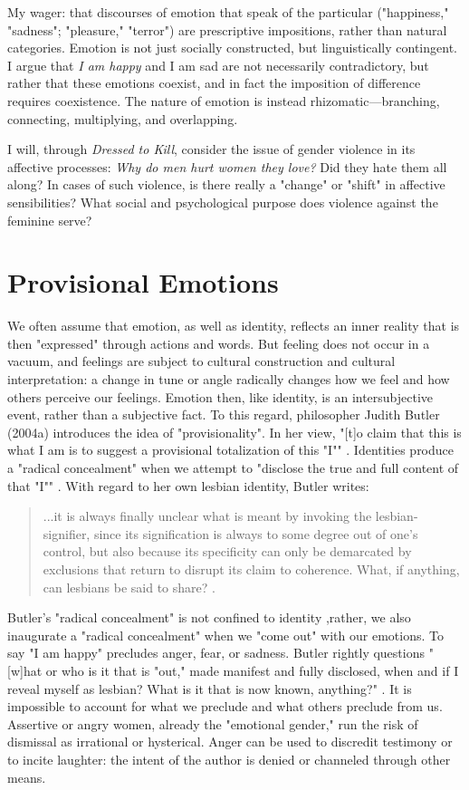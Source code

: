 \documentclass[letterpaper,12pt]{turabian-researchpaper}
\begin{document}
My wager: that discourses of emotion that speak of the particular ("happiness," "sadness"; "pleasure," "terror") are prescriptive impositions, rather than natural categories. Emotion is not just socially constructed, but linguistically contingent. I argue that \textit{I am happy} and {I am sad} are not necessarily contradictory, but rather that these emotions coexist, and in fact the imposition of difference requires coexistence. The nature of emotion is instead rhizomatic---branching, connecting, multiplying, and overlapping. 

I will, through \textit{Dressed to Kill}, consider the issue of gender violence in its affective processes: \textit{Why do men hurt women they love?} Did they hate them all along? In cases of such violence, is there really a "change" or "shift" in affective sensibilities? What social and psychological purpose does violence against the feminine serve?

\section{Provisional Emotions}

We often assume that emotion, as well as identity, reflects an inner reality that is then "expressed" through actions and words. But feeling does not occur in a vacuum, and feelings are subject to cultural construction and cultural interpretation: a change in tune or angle radically changes how we feel and how others perceive our feelings. Emotion then, like identity, is an intersubjective event, rather than a subjective fact. To this regard, philosopher Judith Butler (2004a) introduces the idea of "provisionality". In her view, "[t]o claim that this is what I am is to suggest a provisional totalization of this "I"" \autocite[309]{butler_bodily_2004}. Identities produce a "radical concealment" when we attempt to "disclose the true and full content of that "I"" \autocite[309]{butler_bodily_2004}. With regard to her own lesbian identity, Butler writes:
\begin{quotation}
\noindent ...it is always finally unclear what is meant by invoking the lesbian-signifier, since its signification is always to some degree out of one's control, but also because its specificity can only be demarcated by exclusions that return to disrupt its claim to coherence. What, if anything, can lesbians be said to share? \autocite[309]{butler_bodily_2004}.
\end{quotation}

\noindent Butler's "radical concealment" is not confined to identity ,rather, we also inaugurate a "radical concealment" when we "come out" with our emotions. To say "I am happy" precludes anger, fear, or sadness. Butler rightly questions "[w]hat or who is it that is "out," made manifest and fully disclosed, when and if I reveal myself as lesbian? What is it that is now known, anything?" \autocite[309]{butler_bodily_2004}. It is impossible to account for what we preclude and what others preclude from us. Assertive or angry women, already the "emotional gender," run the risk of dismissal as irrational or hysterical. Anger can be used to discredit testimony or to incite laughter: the intent of the author is denied or channeled through other means.
\end{document}
